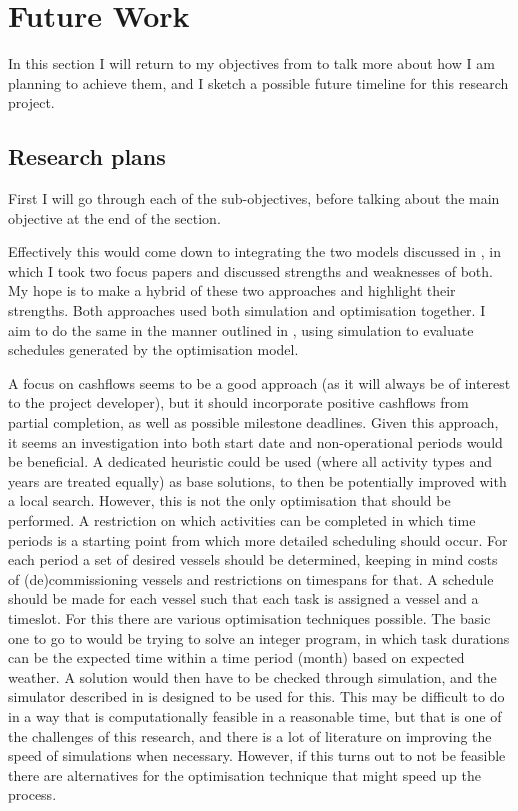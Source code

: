 \documentclass[a4paper,12pt]{article}
\begin{document}
\pagebreak

\section{Future Work} \label{s:concl}
In this section I will return to my objectives from  to talk more about how I am planning to achieve them, and I sketch a possible future timeline for this research project. 

\subsection{Research plans} \label{ss:plans}
First I will go through each of the sub-objectives, before talking about the main objective at the end of the section. 

\subobjone*

Effectively this would come down to integrating the two models discussed in , in which I took two focus papers \cite{barlow2018mixed,kerkhove2017optimised} and discussed strengths and weaknesses of both. My hope is to make a hybrid of these two approaches and highlight their strengths. Both approaches used both simulation and optimisation together. I aim to do the same in the manner outlined in , using simulation to evaluate schedules generated by the optimisation model. 

A focus on cashflows seems to be a good approach (as it will always be of interest to the project developer), but it should incorporate positive cashflows from partial completion, as well as possible milestone deadlines. Given this approach, it seems an investigation into both start date and non-operational periods would be beneficial. A dedicated heuristic  could be used (where all activity types and years are treated equally) as base solutions, to then be potentially improved with a local search. However, this is not the only optimisation that should be performed. A restriction on which activities can be completed in which time periods is a starting point from which more detailed scheduling should occur. For each period a set of desired vessels should be determined, keeping in mind costs of (de)commissioning vessels and restrictions on timespans for that. A schedule should be made for each vessel such that each task is assigned a vessel and a timeslot. For this there are various optimisation techniques possible. The basic one to go to would be trying to solve an integer program, in which task durations can be the expected time within a time period (month) based on expected weather. A solution would then have to be checked through simulation, and the simulator described in  is designed to be used for this. This may be difficult to do in a way that is computationally feasible in a reasonable time, but that is one of the challenges of this research, and there is a lot of literature on improving the speed of simulations when necessary. However, if this turns out to not be feasible there are alternatives for the optimisation technique that might speed up the process. 
\end{document}
